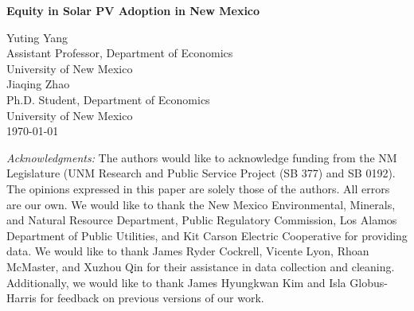 \begin{titlepage}

\newcommand{\HRule}{\rule{\linewidth}{0.5mm}} 

\begin{center} %



{ \huge \bfseries Equity in Solar PV Adoption in New Mexico}\\ %
\end{center}
\vspace{1.5em}

\begin{center}
    \Large
Yuting Yang\\ %
Assistant Professor, Department of Economics\\
University of New Mexico\\
\vspace{1em}
Jiaqing Zhao\\ %
Ph.D. Student, Department of Economics\\
University of New Mexico\\
\vspace{1.5em}
\today


\vspace{1.5em}
\begin{flushleft}
\normalsize

    \textit{Acknowledgments:} The authors would like to acknowledge funding from the NM Legislature (UNM Research and Public Service Project (SB 377) and SB 0192). The opinions expressed in this paper are solely those of the authors. All errors are our own. We would like to thank the New Mexico Environmental, Minerals, and Natural Resource Department, Public Regulatory Commission, Los Alamos Department of Public Utilities, and Kit Carson Electric Cooperative for providing data. We would like to thank James Ryder Cockrell, Vicente Lyon, Rhoan McMaster, and Xuzhou Qin for their assistance in data collection and cleaning. Additionally, we would like to thank 
    James Hyungkwan Kim and Isla Globus-Harris for feedback on previous versions of our work.  \\


\end{flushleft}
\end{center}
\end{titlepage}
